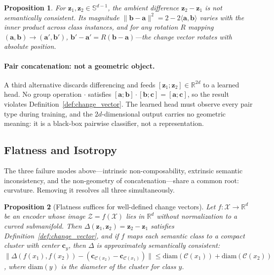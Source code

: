 \documentclass{article}
\newtheorem{proposition}{Proposition}
\newcommand{\vect}[1]{\mathbf{#1}}
\newcommand{\R}{\mathbb{R}}
\newcommand{\Sph}{\mathbb{S}}
\begin{document}
\begin{proposition}
\label{prop:ambient_bad}
For $\vect{z}_1, \vect{z}_2 \in \Sph^{d-1}$, the ambient difference $\vect{z}_2 - \vect{z}_1$ is not semantically consistent. Its magnitude $\|\vect{b} - \vect{a}\|^2 = 2 - 2\langle \vect{a}, \vect{b}\rangle$ varies with the inner product across class instances, and for any rotation $R$ mapping $(\vect{a}, \vect{b}) \to (\vect{a}', \vect{b}')$, $\vect{b}' - \vect{a}' = R(\vect{b} - \vect{a})$---the change vector rotates with absolute position.
\end{proposition}

\paragraph{Pair concatenation: not a geometric object.} A third alternative discards differencing and feeds $[\vect{z}_1; \vect{z}_2] \in \R^{2d}$ to a learned head. No group operation $\cdot$ satisfies $[\vect{a}; \vect{b}] \cdot [\vect{b}; \vect{c}] = [\vect{a}; \vect{c}]$, so the result violates Definition~\ref{def:change_vector}. The learned head must observe every pair type during training, and the $2d$-dimensional output carries no geometric meaning: it is a black-box pairwise classifier, not a representation.\label{rem:concatenation}

\subsection{Flatness and Isotropy}
\label{sec:flat_sufficient}

The three failure modes above---intrinsic non-composability, extrinsic semantic inconsistency, and the non-geometry of concatenation---share a common root: curvature. Removing it resolves all three simultaneously.

\begin{proposition}[Flatness suffices for well-defined change vectors]
\label{prop:flat_sufficient}
Let $f : \mathcal{X} \to \R^d$ be an encoder whose image $\mathcal{Z} = f(\mathcal{X})$ lies in $\R^d$ without normalization to a curved submanifold. Then $\Delta(\vect{z}_1, \vect{z}_2) = \vect{z}_2 - \vect{z}_1$ satisfies Definition~\ref{def:change_vector}, and if $f$ maps each semantic class to a compact cluster with center $\vect{c}_y$, then $\Delta$ is approximately semantically consistent: $\|\Delta(f(x_1), f(x_2)) - (\vect{c}_{\mathcal{C}(x_2)} - \vect{c}_{\mathcal{C}(x_1)})\| \le \mathrm{diam}(\mathcal{C}(x_1)) + \mathrm{diam}(\mathcal{C}(x_2))$, where $\mathrm{diam}(y)$ is the diameter of the cluster for class $y$.
\end{proposition}
\end{document}
